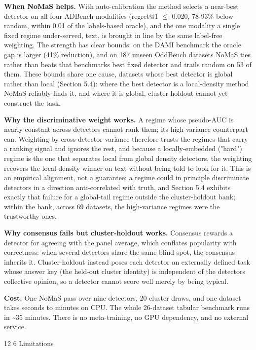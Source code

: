 \documentclass[3p,twocolumn]{elsarticle}
\makeatletter
\renewcommand\section{\@startsection{section}{1}{\z@}%
           {12\p@ \@plus 4\p@ \@minus 4\p@}%
           {6\p@ \@plus 4\p@ \@minus 3\p@}%
           {\normalsize\bfseries\boldmath}}
\makeatother
\begin{document}
\textbf{When NoMaS helps.} With auto-calibration the method selects a near-best detector on all four ADBench modalities (regret@1 $\leq$ 0.020, 78-93\% below random, within 0.01 of the labels-based oracle), and the one modality a single fixed regime under-served, text, is brought in line by the same label-free weighting. The strength has clear bounds: on the DAMI benchmark the oracle gap is larger (41\% reduction), and on 187 unseen OddBench datasets NoMaS ties rather than beats that benchmark\textquotesingle s best fixed detector and trails random on 53 of them. These bounds share one cause, datasets whose best detector is global rather than local (Section 5.4): where the best detector is a local-density method NoMaS reliably finds it, and where it is global, cluster-holdout cannot yet construct the task.

\textbf{Why the discriminative weight works.} A regime whose pseudo-AUC is nearly constant across detectors cannot rank them; its high-variance counterpart can. Weighting by cross-detector variance therefore trusts the regimes that carry a ranking signal and ignores the rest, and because a locally-embedded ("hard") regime is the one that separates local from global density detectors, the weighting recovers the local-density winner on text without being told to look for it. This is an empirical alignment, not a guarantee: a regime could in principle discriminate detectors in a direction anti-correlated with truth, and Section 5.4 exhibits exactly that failure for a global-tail regime outside the cluster-holdout bank; within the bank, across 69 datasets, the high-variance regimes were the trustworthy ones.

\textbf{Why consensus fails but cluster-holdout works.} Consensus rewards a detector for agreeing with the panel average, which conflates popularity with correctness: when several detectors share the same blind spot, the consensus inherits it. Cluster-holdout instead poses each detector an externally defined task whose answer key (the held-out cluster identity) is independent of the detectors\textquotesingle{} collective opinion, so a detector cannot score well merely by being typical.

\textbf{Cost.} One NoMaS pass over nine detectors, 20 cluster draws, and one dataset takes seconds to minutes on CPU. The whole 26-dataset tabular benchmark runs in \textasciitilde35 minutes. There is no meta-training, no GPU dependency, and no external service.

\section{Limitations}\label{7-limitations}
\end{document}
